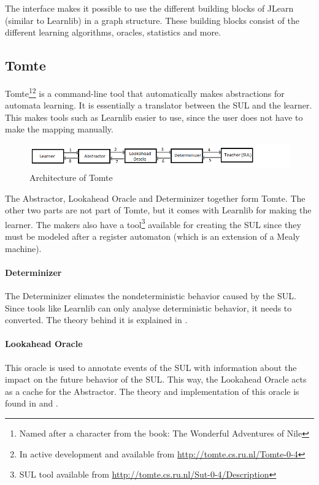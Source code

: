 \documentclass[multi,crop=false,class=article]{standalone}
\begin{document}
The interface makes it possible to use the different building blocks of 
JLearn (similar to Learnlib) in a graph structure. These building blocks 
consist of the different learning algorithms, oracles, statistics and more. 


\subsection{Tomte}
\label{ssec:tomte}

Tomte\footnote{Named after a character from the book: The Wonderful Adventures 
of Nile}\footnote{In active development and available from
\url{http://tomte.cs.ru.nl/Tomte-0-4}} is a command-line tool that 
automatically makes abstractions for automata learning.  It is essentially a 
translator between the SUL and the learner. This makes 
tools such as Learnlib easier to use, since the user does not have to make the 
mapping manually.

\begin{figure}[!h]
	\includegraphics[width=\textwidth]{Tool_images/tomte_network.png}
	\caption{Architecture of Tomte}
	\label{fig:tomte_arch_interaction}
\end{figure}

The Abstractor, Lookahead Oracle and Determinizer together form Tomte. The
other two parts are not part of Tomte, but it comes with Learnlib for making
the learner. The makers also have a tool\footnote{SUL tool available from
\url{http://tomte.cs.ru.nl/Sut-0-4/Description}} available for creating the SUL
since they must be modeled after a register automaton\cite{Aarts2015}
(which is an extension of a Mealy machine).

\paragraph{Determinizer} The Determinizer elimates the nondeterministic
behavior caused by the SUL. Since tools like Learnlib can only analyse
deterministic behavior, it needs to converted. The theory behind it is
explained in \cite[p. 172]{Aarts2015}.

\paragraph{Lookahead Oracle} This oracle is used to annotate events of the SUL
with information about the impact on the future behavior of the SUL. This way,
the Lookahead Oracle acts as a cache for the Abstractor. The theory and
implementation of this oracle is found in \cite[p. 170]{Aarts2014} and
\cite[p. 105]{Tomte2014}.
\end{document}
